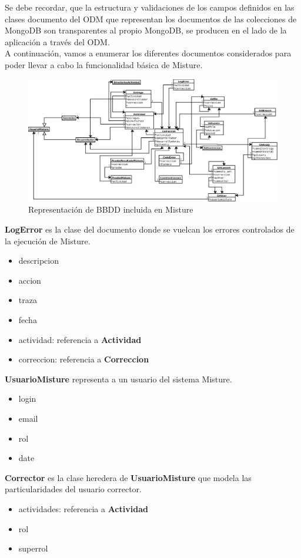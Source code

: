 Se debe recordar, que la estructura y validaciones de los campos definidos en las clases documento del ODM que representan los documentos de las colecciones de MongoDB son transparentes al propio MongoDB, se producen en el lado de la aplicación a través del ODM.\\


A continuación, vamos a enumerar los diferentes documentos considerados para poder llevar a cabo la funcionalidad básica de Misture.\\


\begin{figure}[H]
   \centering
   \includegraphics[width=16cm]{img/Diagram4_bbdd}
   \caption{Representación de BBDD incluida en Misture}
   \label{figura:bbdd}
\end{figure}


\textbf{LogError} es la clase del documento donde se vuelcan los errores controlados de la ejecución de Misture.
\begin{itemize}
\item descripcion
\item accion
\item traza
\item fecha
\item actividad: referencia a \textbf{Actividad}
\item correccion: referencia a \textbf{Correccion}
\end{itemize}


\textbf{UsuarioMisture} representa a un usuario del sistema Misture.
\begin{itemize}
\item login
\item email
\item rol
\item date
\end{itemize}


\textbf{Corrector} es la clase heredera de \textbf{UsuarioMisture} que modela las particularidades del usuario corrector.
\begin{itemize}
\item actividades: referencia a \textbf{Actividad}
\item rol
\item superrol
\end{itemize}


